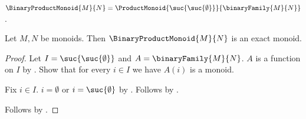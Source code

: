 \begin{definition}\label{binary_product_monoid}
    $\BinaryProductMonoid{M}{N}
        =\ProductMonoid{\suc{\suc{\emptyset}}}{
            \binaryFamily{M}{N}}$.
\end{definition}

\begin{proposition}\label{binary_product_monoid_is_exact}
    Let $M,N$ be monoids.
    Then $\BinaryProductMonoid{M}{N}$ is an exact monoid.
\end{proposition}
\begin{proof}
    Let $I=\suc{\suc{\emptyset}}$ and $A=\binaryFamily{M}{N}$.
    $A$ is a function on $I$ by
        .
    Show that for every $i\in I$ we have $A(i)$ is a monoid.
    \begin{subproof}
        Fix $i\in I$.
        $i=\emptyset$ or $i=\suc{\emptyset}$ by
            .
        Follows by
            .
    \end{subproof}
    Follows by
        .
\end{proof}
